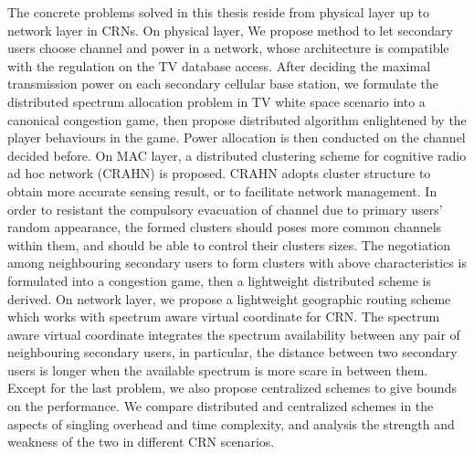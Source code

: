 The concrete problems solved in this thesis reside from physical layer up to network layer in CRNs.
%
On physical layer, We propose method to let secondary users choose channel and power in a network, whose architecture is compatible with the regulation on the TV database access.
After deciding the maximal transmission power on each secondary cellular base station, we formulate the distributed spectrum allocation problem in TV white space scenario into a canonical congestion game, then propose distributed algorithm enlightened by the player behaviours in the game.
Power allocation is then conducted on the channel decided before.
%
On MAC layer, a distributed clustering scheme for cognitive radio ad hoc network (CRAHN) is proposed.
CRAHN adopts cluster structure to obtain more accurate sensing result, or to facilitate network management.
In order to resistant the compulsory evacuation of channel due to primary users' random appearance, the formed clusters should poses more common channels within them, and should be able to control their clusters sizes.
The negotiation among neighbouring secondary users to form clusters with above characteristics is formulated into a congestion game, then a lightweight distributed scheme is derived.
%
On network layer, we propose a lightweight geographic routing scheme which works with spectrum aware virtual coordinate for CRN. 
The spectrum aware virtual coordinate integrates the spectrum availability between any pair of neighbouring secondary users, in particular, the distance between two secondary users is longer when the available spectrum is more scare in between them.
%
Except for the last problem, we also propose centralized schemes to give bounds on the performance.
We compare distributed and centralized schemes in the aspects of singling overhead and time complexity, and analysis the strength and weakness of the two in different CRN scenarios.



